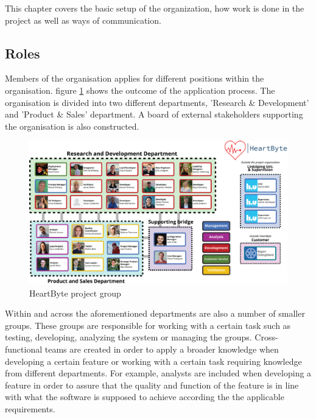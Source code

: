 This chapter covers the basic setup of the organization, how work is done in the project as well as ways of communication. 

\subsection{Roles}
Members of the organisation applies for different positions within the organisation. figure \ref{fig:company structure} shows the outcome of the application process. The organisation is divided into two different departments, 'Research \& Development' and 'Product \& Sales' department. A board of external stakeholders supporting the organisation is also constructed.  

\begin{figure}[hbt!]
\centering
\includegraphics[width=\linewidth]{Pictures/Organization.png}
\caption{HeartByte project group}
\label{fig:company structure}
\end{figure}

Within and across the aforementioned departments are also a number of smaller groups. These groups are responsible for working with a certain task such as testing, developing, analyzing the system or managing the groups. Cross-functional teams are created in order to apply a broader knowledge when developing a certain feature or working with a certain task requiring knowledge from different departments. For example, analysts are included when developing a feature in order to assure that the quality and function of the feature is in line with what the software is supposed to achieve according the the applicable requirements. \\ 

